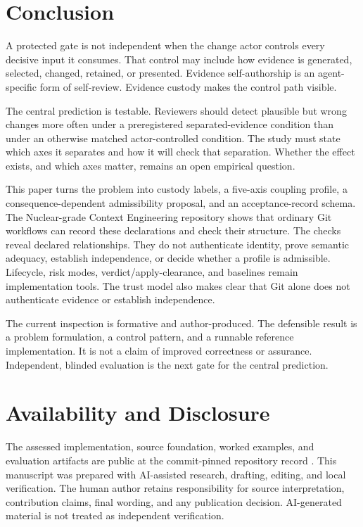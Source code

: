 \documentclass[11pt]{article}
\newcommand{\method}{Nuclear-grade Context Engineering}
\begin{document}
\section{Conclusion}
\label{sec:conclusion}

A protected gate is not independent when the change actor controls every decisive input it consumes. That control may include how evidence is generated, selected, changed, retained, or presented. Evidence self-authorship is an agent-specific form of self-review. Evidence custody makes the control path visible.

The central prediction is testable. Reviewers should detect plausible but wrong changes more often under a preregistered separated-evidence condition than under an otherwise matched actor-controlled condition. The study must state which axes it separates and how it will check that separation. Whether the effect exists, and which axes matter, remains an open empirical question.

This paper turns the problem into custody labels, a five-axis coupling profile, a consequence-dependent admissibility proposal, and an acceptance-record schema. The \method{} repository shows that ordinary Git workflows can record these declarations and check their structure. The checks reveal declared relationships. They do not authenticate identity, prove semantic adequacy, establish independence, or decide whether a profile is admissible. Lifecycle, risk modes, verdict/apply-clearance, and baselines remain implementation tools. The trust model also makes clear that Git alone does not authenticate evidence or establish independence.

The current inspection is formative and author-produced. The defensible result is a problem formulation, a control pattern, and a runnable reference implementation. It is not a claim of improved correctness or assurance. Independent, blinded evaluation is the next gate for the central prediction.

\section*{Availability and Disclosure}

The assessed implementation, source foundation, worked examples, and evaluation artifacts are public at the commit-pinned repository record \citep{flyfission2026repo}. This manuscript was prepared with AI-assisted research, drafting, editing, and local verification. The human author retains responsibility for source interpretation, contribution claims, final wording, and any publication decision. AI-generated material is not treated as independent verification.
\end{document}
